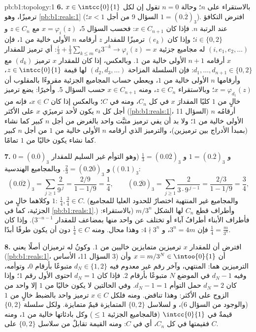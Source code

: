 \begin{solution}{pb:b1:topology:1}
\textbf{6.} بالاستقراء على $n$؛ وحالة $n = 0$ تقول إن لكل $x \in
\intcc{0}{1}$ ترميزًا، وهو \cref{pb:b1:reals:1}
(السؤال 9 من أجل $x < 1$؛ $1 = (0.\overline 2)_3$). افترض
التكافؤ عند الرتبة $n$. فإذا كان $x \in C_{n+1}$: فحسب السؤال 5، $x =
\varphi_i(z)$ مع $z \in C_n$ و $i \in \{0, 2\}$؛ وإذا كان $(e_k)$
ترميزًا للمقدار $z$ أرقامه $n$ الأولى خالية من $1$، فإن $(i, e_1,
e_2, \dots)$ له مجاميع جزئية $\frac i3 + \frac13\sum_{k\leq m}
e_k 3^{-k} \to \varphi_i(z) = x$: أي ترميز للمقدار $x$ أرقامه $n +
1$ الأولى خالية من $1$. وبالعكس، إذا كان للمقدار $x$ ترميز $(d_k)$ مع
$d_1, \dots, d_{n+1} \in \{0, 2\}$: فإن السلسلة المزاحة $(d_2,
d_3, \dots)$ لها قيمة $z \in \intcc{0}{1}$، وأرقامها $n$
الأولى خالية من $1$، ويعطي حساب المجاميع الجزئية مقروءًا
بالمقلوب أن $x = \varphi_{d_1}(z)$؛ وبالاستقراء $z \in
C_n$، ومنه $x \in C_{n+1}$ حسب السؤال 5. وأخيرًا: يضع ترميز
خالٍ من $1$ كليًا المقدارَ $x$ في كل $C_n$، ومنه في $C$؛ وبالعكس
إذا كان $x \in C$، فإنه من أجل كل $n$ يكون لأحد ترميزَي
$x$ على الأكثر (\cref{pb:b1:reals:1}، السؤال 11) أرقامُه $n$ الأولى
خالية من $1$؛ ولا بد أن يفي ترميز مثبَّت واحد بالغرض من أجل $n$ كبير
كما نشاء (بمبدأ الأدراج بين ترميزين)، والترميز الذي أرقامه $n$
الأولى خالية من $1$ من أجل $n$ كبير كما نشاء يكون خاليًا من $1$
تمامًا.

\textbf{7.} $0 = (0.\overline 0)_3$ و $1 = (0.\overline 2)_3$ و
$\frac13 = (0.0\overline{2})_3$ (وهو التوأم غير السليم للمقدار $(0.1)_3$) و
$\frac23 = (0.2\overline{0})_3$. وبالمجاميع الهندسية:
\[
(0.\overline{02})_3 = \sum_{j\geq1} \frac{2}{9^{\,j}}
= \frac{2/9}{1 - 1/9} = \frac14 ,
\qquad
(0.\overline{20})_3 = \sum_{j\geq1} \frac{2}{3\cdot 9^{\,j-1}}
= \frac{2/3}{1 - 1/9} = \frac34 ,
\]
وكلاهما خالٍ من $1$: $\frac14, \frac34 \in C$. (والمجاميع غير المنتهية
اختصارٌ للحدود العليا للمجاميع الجزئية، كما في \cref{pb:b1:reals:1}.)
وأطراف قطع $C_n$ لها الشكل $m/3^n$
(بالاستقراء: فأطراف الأبناء أطرافُ آباء أو تختلف
عن واحد منها بمضاعف للمقدار $3^{-n-1}$). وإذا كان $\frac14 =
\frac{m}{3^n}$ فإن $3^n = 4m$، و $4 \nmid 3^n$: وهذا محال.
ومنه $\frac14 \in C$ دون أن يكون طرفًا أبدًا.

\textbf{8.} افترض أن للمقدار $x$ ترميزين متمايزين خاليين من $1$. وكونُ
له ترميزان أصلًا يعني (\cref{pb:b1:reals:1}، السؤال 11، الأساس
$3$) أن $x = m/3^N \in \intoo{0}{1}$ وأن الترميزين هما:
المنتهي، وآخر رقم غير معدوم فيه $d_N \in \{1, 2\}$
متبوعًا بأرقام $0$، وتوأمه، وفيه $d_N - 1$ في الموضع $N$
متبوعًا بأرقام $2$. فإذا كان $d_N = 1$ احتوى الأول رقم $1$؛ وإذا كان $d_N
= 2$ حمل التوأم $d_N - 1 = 1$. وفي الحالتين لا يكون خاليًا من $1$
إلا واحد من الزوج على الأكثر: وهذا تناقض. ومنه فلكل $x \in C$
ترميز واحد بالضبط خالٍ من $1$ (والوجود من السؤال 6)، و
لسلاسل $\{0,2\}$ المتمايزة قيمٌ متمايزة. ولكل
سلسلة $\{0,2\}$ قيمةٌ في $\intcc{0}{1}$ (فالمجاميع الجزئية $\leq
1$) وكل بادئاتها خالية من $1$، ومنه فقيمتها في كل $C_n$،
أي في $C$: ومنه  القيمة تقابلٌ من
سلاسل $\{0,2\}$ على $C$.


\end{solution}
